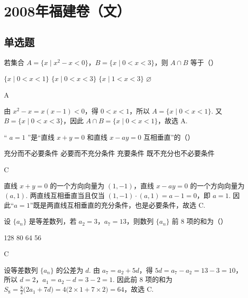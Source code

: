 \chapter{2008年福建卷（文）}
\section{单选题}

\begin{problem}
若集合 \(A = \{x \mid x^2 - x < 0\}\)，\(B = \{x \mid 0 < x < 3\}\)，则 \(A \cap B\) 等于（\quad）

\choices
    {\(\{x \mid 0 < x < 1\}\)}
    {\(\{x \mid 0 < x < 3\}\)}
    {\(\{x \mid 1 < x < 3\}\)}
    {\(\varnothing\)}

\begin{answer}
A
\end{answer}

\begin{solution}
由 \(x^2-x=x(x-1)<0\)，得 \(0<x<1\)，所以 \(A=\{x\mid 0<x<1\}\). 又 \(B=\{x\mid 0<x<3\}\)，因此 \(A\cap B=\{x\mid 0<x<1\}\)，故选 A.
\end{solution}
\end{problem}

\begin{problem}
“ \(a = 1\) ”是“直线 \(x + y = 0\) 和直线 \(x - ay = 0\) 互相垂直”的（\quad）

\choices
    {充分而不必要条件}
    {必要而不充分条件}
    {充要条件}
    {既不充分也不必要条件}

\begin{answer}
C
\end{answer}

\begin{solution}
直线 \(x+y=0\) 的一个方向向量为 \((1,-1)\)，直线 \(x-ay=0\) 的一个方向向量为 \((a,1)\). 两直线互相垂直当且仅当 \((1,-1)\cdot(a,1)=a-1=0\)，即 \(a=1\). 因此“\(a=1\)”既是两直线互相垂直的充分条件，也是必要条件，故选 C.
\end{solution}
\end{problem}

\begin{problem}
设 \(\{a_{n}\}\) 是等差数列，若 \(a_{2} = 3\)，\(a_{7} = 13\)，则数列 \(\{a_{n}\}\) 前 8 项的和为（\quad）

\choices
    {128}
    {80}
    {64}
    {56}

\begin{answer}
C
\end{answer}

\begin{solution}
设等差数列 \(\{a_n\}\) 的公差为 \(d\). 由 \(a_7=a_2+5d\)，得 \(5d=a_7-a_2=13-3=10\)，所以 \(d=2\)，\(a_1=a_2-d=3-2=1\). 因此前 8 项的和为 \(S_8=\frac{8}{2}\bigl(2a_1+7d\bigr)=4\bigl(2\times1+7\times2\bigr)=64\)，故选 C.
\end{solution}
\end{problem}


